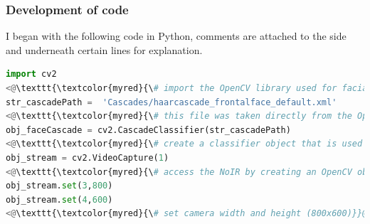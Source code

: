 \documentclass[9pt]{article}
\begin{document}
\subsubsection{Development of code}
I began with the following code in Python, comments are attached to the side and underneath certain lines for explanation.
\begin{lstlisting}[language=Python]
import cv2 
<@\texttt{\textcolor{myred}{\# import the OpenCV library used for facial recognition into our code, we can then call all functions in this library}}@>
str_cascadePath =  'Cascades/haarcascade_frontalface_default.xml'
<@\texttt{\textcolor{myred}{\# this file was taken directly from the OpenCV GitHub repo}}@>
obj_faceCascade = cv2.CascadeClassifier(str_cascadePath)
<@\texttt{\textcolor{myred}{\# create a classifier object that is used to identify faces using the cascade that str\_cascadePath points to}}@> 
obj_stream = cv2.VideoCapture(1)
<@\texttt{\textcolor{myred}{\# access the NoIR by creating an OpenCV object that uses the camera}}@> 
obj_stream.set(3,800) 
obj_stream.set(4,600)
<@\texttt{\textcolor{myred}{\# set camera width and height (800x600)}}@>


\end{lstlisting}
\end{document}
